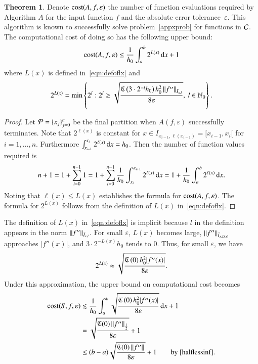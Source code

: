 \documentclass[review]{elsarticle}
\newcommand{\abstol}{\varepsilon}
\theoremstyle{definition}
\newtheorem{theorem}{Theorem}
\begin{document}
\begin{theorem}\label{thm:cost}
Denote $\cost(A,f,\abstol)$ the number of function evaluations required by Algorithm $A$ for the input function $f$ and the absolute error 
tolerance~$\abstol$.  This algorithm is known to successfully solve problem~\eqref{appxprob} for functions in $\cc$.  The computational cost of doing so has the following upper bound:
\begin{equation*}
\cost(A,f,\abstol) \le \frac{1}{h_0}\int_a^b 2^{L(x)} \, \dif x +1 \\
\end{equation*}
where $L(x)$ is defined in~\eqref{eqn:defoflx} and
\begin{equation*}
2^{L(x)} = \min\left\{2^l:  2^l \ge \sqrt{\frac{\fC\left(3\cdot 2^{-l} h_0\right) h_0^2 \norm[\bar{I}_{x,l}]{f''} }{8 \abstol}}, \  l \in  \natzero\right\}.
\end{equation*}
\end{theorem}

\begin{proof}
Let $\cp=\{x_j\}_{j=0}^n$ be the final partition when $A(f,\abstol)$ successfully terminates. Note that $2^{\ell(x)}$ is constant for  $x \in I_{x_{i-1},\ell(x_{i-1})} = [x_{i-1},x_{i}[$ for $i=1, \ldots, n$.  Furthermore  $\int_{x_{i-1}}^{x_{i}} 2^{\ell(x)} \, \dif  x =  h_0$.  Then the number of function values required is
\begin{equation*}
n+1 = 1 + \sum_{i=0}^{n-1} 1 = 1 + \sum_{i=0}^{n-1} \frac{1}{h_0} \int_{x_i}^{x_{i+1}} 2^{\ell(x)} \, \dif  x = 1 + \frac{1}{h_0}\int_a^b 2^{\ell(x)} \, \dif x.
\end{equation*}
Noting that $\ell(x) \le L(x)$ establishes the formula for $\cost(A,f,\abstol)$.  The formula for $2^{L(x)}$ follows from the definition of $L(x)$
in~\eqref{eqn:defoflx}.
\end{proof}

The definition of $L(x)$ in~\eqref{eqn:defoflx} is implicit because $l$ in the definition appears in the norm $\norm[\bar{I}_{x,l}]{f''}$.  For small $\abstol$, $L(x)$ becomes large,  $\norm[\bar{I}_{x,L(x)}]{f''}$ approaches $|f''(x)|$, and $3\cdot 2^{-L(x)}h_0$ tends to $0$.  Thus, for small $\abstol$, we have
\begin{equation} \label{twoLxapprox}
 2^{L(x)} \approx \sqrt{\frac{\fC\left(0\right)  h_0^2 |f''(x)|}{8\abstol}}.
 \end{equation}
Under this approximation, the upper bound on computational cost becomes
\begin{align}
\nonumber
\cost(S,f,\abstol)  &\lesssim \frac{1}{h_0}\int_a^b \sqrt{\frac{\fC\left(0\right)  h_0^2 |f''(x)|}{8\abstol}} \, \dif x +1 \\
& =\sqrt{\frac{\fC(0) \norm[\frac 12]{f''}}{8\abstol}} +1 \label{costbdapprox} \\
& \le (b-a)\sqrt{\frac{\fC(0) \norm{f''}}{8\abstol}} +1 \label{costbdinf}  \qquad \text{by \eqref{halflessinf}}.
\end{align}
\end{document}
